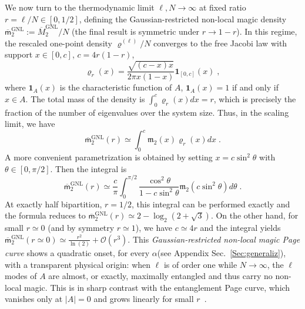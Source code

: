\documentclass[prx,twocolumn,superscriptaddress,aps,10pt, frontmatterverbose, reprint,footinbib,longbibliography=true]{revtex4-2}
\newcommand{\RENYI}{\alpha}
\providecommand{\DIFaddtex}[1]{{\protect\color{red}\uwave{#1}}} %
\providecommand{\DIFdeltex}[1]{{\protect\color{red}\sout{#1}}}                      %
\providecommand{\DIFaddbegin}{\protect\color{red}} %
\providecommand{\DIFaddend}{\protect\color{black}} %
\providecommand{\DIFdelbegin}{} %
\providecommand{\DIFdelend}{} %
\providecommand{\DIFadd}[1]{\texorpdfstring{\DIFaddtex{#1}}{#1}} %
\providecommand{\DIFdel}[1]{\texorpdfstring{\DIFdeltex{#1}}{}} %
\newcommand{\DIFscaledelfig}{0.5}
\newlength{\DIFdelgraphicswidth} %
\newlength{\DIFdelgraphicsheight} %
\newcommand{\DIFaddincludegraphics}[2][]{{\color{blue}\fbox{\DIFOincludegraphics[#1]{#2}}}} %
\newcommand{\DIFdelincludegraphics}[2][]{%
\sbox{\DIFdelgraphicsbox}{\DIFOincludegraphics[#1]{#2}}%
\settoboxwidth{\DIFdelgraphicswidth}{\DIFdelgraphicsbox} %
\settoboxtotalheight{\DIFdelgraphicsheight}{\DIFdelgraphicsbox} %
\scalebox{\DIFscaledelfig}{%
\parbox[b]{\DIFdelgraphicswidth}{\usebox{\DIFdelgraphicsbox}\\[-\baselineskip] \rule{\DIFdelgraphicswidth}{0em}}\llap{\resizebox{\DIFdelgraphicswidth}{\DIFdelgraphicsheight}{%
\setlength{\unitlength}{\DIFdelgraphicswidth}%
\begin{picture}(1,1)%
\thicklines\linethickness{2pt} %
{\color[rgb]{1,0,0}\put(0,0){\framebox(1,1){}}}%
{\color[rgb]{1,0,0}\put(0,0){\line( 1,1){1}}}%
{\color[rgb]{1,0,0}\put(0,1){\line(1,-1){1}}}%
\end{picture}%
}\hspace*{3pt}}} %
} %
\DeclareRobustCommand{\DIFaddbegin}{\DIFOaddbegin \let\includegraphics\DIFaddincludegraphics} %
\DeclareRobustCommand{\DIFaddend}{\DIFOaddend \let\includegraphics\DIFOincludegraphics} %
\DeclareRobustCommand{\DIFdelbegin}{\DIFOdelbegin \let\includegraphics\DIFdelincludegraphics} %
\DeclareRobustCommand{\DIFdelend}{\DIFOaddend \let\includegraphics\DIFOincludegraphics} %
\begin{document}
We now turn to the thermodynamic limit $\ell,N\to\infty$ at fixed ratio $r=\ell/N\in[0,1/2]$, defining the Gaussian-restricted non-local magic density $\overline{\mathsf{m}}_2^\mathrm{GNL}:=\overline{M}_2^\mathrm{GNL}/N$ (the final result is symmetric under $r\to 1-r$).
In this regime, the rescaled  one-point density $\varrho^{(\ell)}/N$ converges to the free Jacobi law with support $x\in [0,c]$, $c=4r(1-r)$,
\begin{equation}
    \varrho_r(x) = \frac{\sqrt{(c-x)x}}{2\pi x(1-x)}\mathbf{1}_{[0,c]}(x)\;,
\end{equation}
where $\mathbf{1}_A(x)$ is the characteristic function of $A$, $\mathbf{1}_A(x)=1$ if and only if $x\in A$. 
The total mass of the density is $\int_0^c \varrho_r(x) dx=r$, which is precisely the fraction of the number of eigenvalues over the system size. 
Thus, in the scaling limit, we have
\begin{equation}
\overline{\mathsf{m}}_2^\mathrm{GNL}(r)\simeq \int_0^c \mathfrak{m}_2(x) \varrho_r(x)dx\;.
\end{equation}
A more convenient parametrization is obtained by setting $x=c\sin^2\theta$  with $\theta\in[0,\pi/2]$. Then the integral is 
\begin{equation}
\overline{\mathsf{m}}_2^\mathrm{GNL}(r)\simeq \frac{c}{\pi}\int_0^{\pi/2} \frac{\cos^2 \theta}{1-c\sin^2\theta} \mathfrak{m}_2(c\sin^2 \theta)d\theta\;.\label{eq:ziopin2}
\end{equation}
At exactly half bipartition, $r=1/2$, this integral can be performed exactly and the formula reduces to 
$\overline{\mathsf{m}}_2^\mathrm{GNL}(r)\simeq 2-\log_2(2+\sqrt{3})$.
On the other hand, for small $r\simeq 0$ (and by symmetry $r\simeq 1$), we have $c\simeq 4r$ and the integral yields $\overline{\mathsf{m}}_2^\mathrm{GNL}(r\simeq 0)\simeq \frac{r^2}{\ln(2)}+\mathcal{O}(r^3)$. 
This {\em Gaussian-restricted non-local magic Page curve} shows a  quadratic onset,  for every \DIFdelbegin \DIFdel{$\alpha$}\DIFdelend \DIFaddbegin \DIFadd{$\RENYI$ }\DIFaddend (see Appendix Sec.~\ref{Sec:generaliz}), with a transparent physical origin: when $\ell$ is of order one while $N\to\infty$, the $\ell$ modes of $A$ are almost, or exactly, maximally entangled and thus carry no non-local magic. 
This is in sharp contrast with the entanglement Page curve, which vanishes only at $|A|=0$ and grows linearly for small $r$~\cite{PhysRevE.106.034118,PhysRevLett.125.180604,PhysRevB.103.L241118}.
\end{document}
